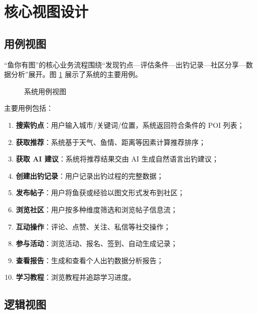 \documentclass[12pt,a4paper]{ctexart}
\begin{document}
\newpage

\section{核心视图设计}

\subsection{用例视图}

“鱼你有图”的核心业务流程围绕“发现钓点—评估条件—出钓记录—社区分享—数据分析”展开。图 \ref{fig:use-case} 展示了系统的主要用例。

\begin{figure}[H]
  \centering
  \caption{系统用例视图}
  \label{fig:use-case}
\end{figure}

主要用例包括：
\begin{enumerate}
  \item \textbf{搜索钓点}：用户输入城市/关键词/位置，系统返回符合条件的 POI 列表；
  \item \textbf{获取推荐}：系统基于天气、鱼情、距离等因素计算推荐排序；
  \item \textbf{获取 AI 建议}：系统将推荐结果交由 AI 生成自然语言出钓建议；
  \item \textbf{创建出钓记录}：用户记录出钓过程的完整数据；
  \item \textbf{发布帖子}：用户将鱼获或经验以图文形式发布到社区；
  \item \textbf{浏览社区}：用户按多种维度筛选和浏览帖子信息流；
  \item \textbf{互动操作}：评论、点赞、关注、私信等社交操作；
  \item \textbf{参与活动}：浏览活动、报名、签到、自动生成记录；
  \item \textbf{查看报告}：生成和查看个人出钓数据分析报告；
  \item \textbf{学习教程}：浏览教程并追踪学习进度。
\end{enumerate}

\subsection{逻辑视图}
\end{document}
